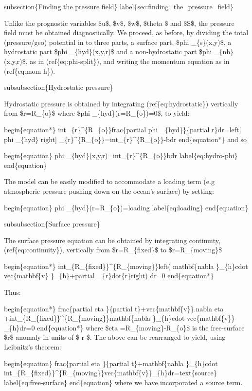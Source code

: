 \documentclass[letterpaper,10pt,english]{sphinxmanual}
\begin{document}
subsection\{Finding the pressure field\}
label\{sec:finding\_the\_pressure\_field\}

Unlike the prognostic variables \$u\$, \$v\$, \$w\$, \$theta \$ and \$S\$, the
pressure field must be obtained diagnostically. We proceed, as before, by
dividing the total (pressure/geo) potential in to three parts, a surface
part, \$phi \_\{s\}(x,y)\$, a hydrostatic part \$phi \_\{hyd\}(x,y,r)\$ and a
non-hydrostatic part \$phi \_\{nh\}(x,y,r)\$, as in (ref\{eq:phi-split\}), and
writing the momentum equation as in (ref\{eq:mom-h\}).

subsubsection\{Hydrostatic pressure\}

Hydrostatic pressure is obtained by integrating (ref\{eq:hydrostatic\})
vertically from \$r=R\_\{o\}\$ where \$phi \_\{hyd\}(r=R\_\{o\})=0\$, to yield:

begin\{equation*\}
int\_\{r\}\textasciicircum{}\{R\_\{o\}\}frac\{partial phi \_\{hyd\}\}\{partial r\}dr=left{[} phi \_\{hyd\}
right{]} \_\{r\}\textasciicircum{}\{R\_\{o\}\}=int\_\{r\}\textasciicircum{}\{R\_\{o\}\}-bdr
end\{equation*\}
and so

begin\{equation\}
phi \_\{hyd\}(x,y,r)=int\_\{r\}\textasciicircum{}\{R\_\{o\}\}bdr  label\{eq:hydro-phi\}
end\{equation\}

The model can be easily modified to accommodate a loading term (e.g
atmospheric pressure pushing down on the ocean's surface) by setting:

begin\{equation\}
phi \_\{hyd\}(r=R\_\{o\})=loading  label\{eq:loading\}
end\{equation\}

subsubsection\{Surface pressure\}

The surface pressure equation can be obtained by integrating continuity,
(ref\{eq:continuity\}), vertically from \$r=R\_\{fixed\}\$ to \$r=R\_\{moving\}\$

begin\{equation*\}
int\_\{R\_\{fixed\}\}\textasciicircum{}\{R\_\{moving\}\}left( mathbf\{nabla \}\_\{h\}cdot vec\{mathbf\{v\}
\}\_\{h\}+partial \_\{r\}dot\{r\}right) dr=0
end\{equation*\}

Thus:

begin\{equation*\}
frac\{partial eta \}\{partial t\}+vec\{mathbf\{v\}\}.nabla eta
+int\_\{R\_\{fixed\}\}\textasciicircum{}\{R\_\{moving\}\}mathbf\{nabla \}\_\{h\}cdot vec\{mathbf\{v\}\}
\_\{h\}dr=0
end\{equation*\}
where \$eta =R\_\{moving\}-R\_\{o\}\$ is the free-surface \$r\$-anomaly in units of \$
r \$. The above can be rearranged to yield, using Leibnitz's theorem:

begin\{equation\}
frac\{partial eta \}\{partial t\}+mathbf\{nabla \}\_\{h\}cdot
int\_\{R\_\{fixed\}\}\textasciicircum{}\{R\_\{moving\}\}vec\{mathbf\{v\}\}\_\{h\}dr=text\{source\}
label\{eq:free-surface\}
end\{equation\}
where we have incorporated a source term.
\end{document}
